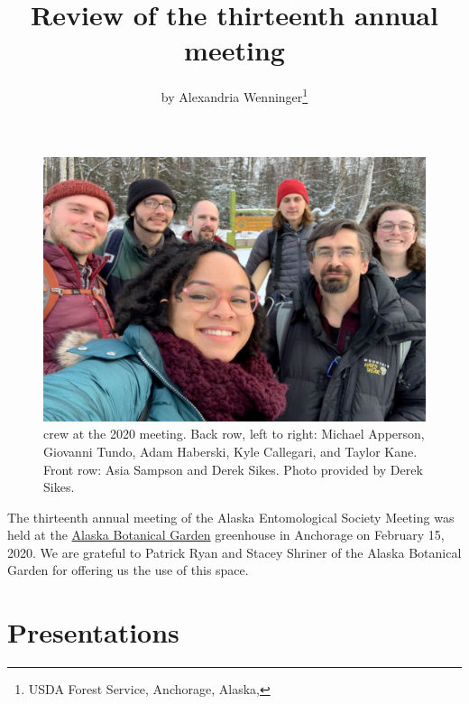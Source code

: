 \title{Review of the thirteenth annual meeting}

\author{by Alexandria Wenninger\footnote{USDA Forest Service, Anchorage, Alaska, }}

\maketitle

\begin{figure}[H]
\begin{center}
\includegraphics[width=\textwidth]{img/meeting.jpg}
\caption{ crew at the 2020  meeting. Back row, left to right: Michael Apperson, Giovanni Tundo, Adam Haberski, Kyle Callegari, and Taylor Kane. Front row: Asia Sampson and Derek Sikes. Photo provided by Derek Sikes.}
\label{meeting_photo}
\end{center}
\end{figure}

The thirteenth annual meeting of the Alaska Entomological Society Meeting was held at the \href{https://www.alaskabg.org/}{Alaska Botanical Garden} greenhouse in Anchorage on February 15, 2020. We are grateful to Patrick Ryan and Stacey Shriner of the Alaska Botanical Garden for offering us the use of this space. 

\section{Presentations}

